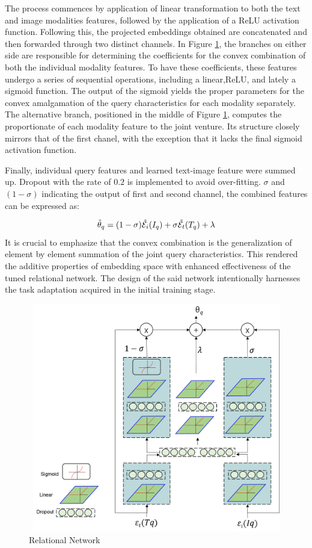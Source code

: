 \documentclass[10pt,lineno]{wlpeerj}
\begin{document}
The process commences by application of linear transformation to both the text and image modalities features, followed by the application of a ReLU activation function. Following this, the projected embeddings obtained are concatenated and then forwarded through two distinct channels. In Figure \ref{fig:RN_framework}, the branches on either side are responsible for determining the coefficients for the convex combination of both the individual modality features. To have these coefficients, these features undergo a series of sequential operations, including a linear,ReLU, and lately a sigmoid function. The output of the sigmoid yields the proper parameters for the convex amalgamation of the query characteristics for each modality separately. The alternative branch, positioned in the middle of Figure \ref{fig:RN_framework}, computes the proportionate of each modality feature to the joint venture. Its structure closely mirrors that of the first chanel, with the exception that it lacks the final sigmoid activation function.

Finally, individual query features and learned text-image feature were summed up. Dropout with the rate of $0.2$ is implemented to avoid over-fitting. $\sigma$ and $(1 - \sigma)$ indicating the output of first and second channel, the combined features can be expressed as:

\begin{equation}
    \centering
    \tilde\theta_q = (1 - \sigma)\tilde{\mathcal{E}_i}(I_q) +\sigma\tilde{\mathcal{E}_t}(T_q) + \lambda
\label{eq:thetha_q_comb}
\end{equation}
It is crucial to emphasize that the convex combination is the generalization of element by element summation of the joint query characteristics. This rendered the additive properties of embedding space with enhanced effectiveness of the tuned relational network. The design of the said network intentionally harnesses the task adaptation acquired in the initial training stage.

\begin{figure}[t]
    \centering
      \includegraphics[width=1\textwidth,height=100mm]{Integrator.jpg}
        \caption{Relational Network}
    \label{fig:RN_framework}
\end{figure}
\FloatBarrier
\end{document}
